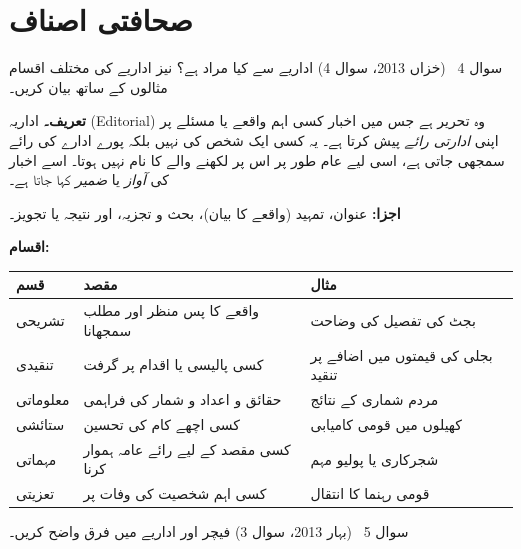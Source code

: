 \section*{صحافتی اصناف}

\begin{sawal}{سوال \textenglish{4} \ \textnormal{\small(خزاں \textenglish{2013}، سوال \textenglish{4})}}
اداریے سے کیا مراد ہے؟ نیز اداریے کی مختلف اقسام مثالوں کے ساتھ بیان کریں۔
\end{sawal}

\begin{hal}
\textbf{تعریف۔} اداریہ (\textenglish{Editorial}) وہ تحریر ہے جس میں اخبار کسی
اہم واقعے یا مسئلے پر اپنی \emph{ادارتی رائے} پیش کرتا ہے۔ یہ کسی ایک شخص کی
نہیں بلکہ پورے ادارے کی رائے سمجھی جاتی ہے، اسی لیے عام طور پر اس پر لکھنے
والے کا نام نہیں ہوتا۔ اسے اخبار کی \emph{آواز} یا \emph{ضمیر} کہا جاتا ہے۔

\medskip
\textbf{اجزا:} عنوان، تمہید (واقعے کا بیان)، بحث و تجزیہ، اور نتیجہ یا تجویز۔

\medskip
\textbf{اقسام:}
\begin{center}
\begin{tabular}{@{}p{3.4cm} p{5.4cm} p{5.6cm}@{}}
\toprule
\textbf{قسم} & \textbf{مقصد} & \textbf{مثال} \\
\midrule
تشریحی & واقعے کا پس منظر اور مطلب سمجھانا & بجٹ کی تفصیل کی وضاحت \\
تنقیدی & کسی پالیسی یا اقدام پر گرفت & بجلی کی قیمتوں میں اضافے پر تنقید \\
معلوماتی & حقائق و اعداد و شمار کی فراہمی & مردم شماری کے نتائج \\
ستائشی & کسی اچھے کام کی تحسین & کھیلوں میں قومی کامیابی \\
مہماتی & کسی مقصد کے لیے رائے عامہ ہموار کرنا & شجرکاری یا پولیو مہم \\
تعزیتی & کسی اہم شخصیت کی وفات پر & قومی رہنما کا انتقال \\
\bottomrule
\end{tabular}
\end{center}

\end{hal}

\begin{sawal}{سوال \textenglish{5} \ \textnormal{\small(بہار \textenglish{2013}، سوال \textenglish{3})}}
فیچر اور اداریے میں فرق واضح کریں۔
\end{sawal}

